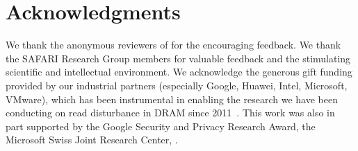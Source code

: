 \section*{Acknowledgments} {
We thank the anonymous reviewers of  for the encouraging feedback.
We thank the SAFARI Research Group members for valuable feedback and the stimulating scientific and intellectual environment.
We acknowledge the generous gift funding provided by our industrial partners (especially Google, Huawei, Intel, Microsoft, VMware), which has been instrumental in enabling the research we have been conducting on read disturbance in DRAM since 2011~\cite{kim2023flipping}.
This work was also in part supported by the Google Security and Privacy Research Award, the Microsoft Swiss Joint Research Center, .
}

